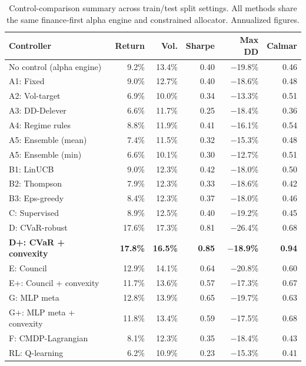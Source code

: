 \documentclass[11pt]{article}
\begin{document}
\begin{table}[t]
\centering
\small
\caption{Control-comparison summary across train/test split settings. All
methods share the same finance-first alpha engine and constrained allocator.
Annualized figures.}
\label{tab:metrics}
\begin{tabular}{@{} l r r r r r @{}}
\toprule
\textbf{Controller} & \textbf{Return} & \textbf{Vol.} & \textbf{Sharpe} & \textbf{Max DD} & \textbf{Calmar} \\
\midrule
No control (alpha engine) & 9.2\% & 13.4\% & 0.40 & $-$19.8\% & 0.46 \\
A1: Fixed & 9.0\% & 12.7\% & 0.40 & $-$18.6\% & 0.48 \\
A2: Vol-target & 6.9\% & 10.0\% & 0.34 & $-$13.3\% & 0.51 \\
A3: DD-Delever & 6.6\% & 11.7\% & 0.25 & $-$18.4\% & 0.36 \\
A4: Regime rules & 8.8\% & 11.9\% & 0.41 & $-$16.1\% & 0.54 \\
A5: Ensemble (mean) & 7.4\% & 11.5\% & 0.32 & $-$15.3\% & 0.48 \\
A5: Ensemble (min) & 6.6\% & 10.1\% & 0.30 & $-$12.7\% & 0.51 \\
B1: LinUCB & 9.0\% & 12.3\% & 0.42 & $-$18.0\% & 0.50 \\
B2: Thompson & 7.9\% & 12.3\% & 0.33 & $-$18.6\% & 0.42 \\
B3: Eps-greedy & 8.4\% & 12.3\% & 0.37 & $-$18.0\% & 0.46 \\
C: Supervised & 8.9\% & 12.5\% & 0.40 & $-$19.2\% & 0.45 \\
D: CVaR-robust & 17.6\% & 17.3\% & 0.81 & $-$26.4\% & 0.68 \\
\textbf{D+: CVaR + convexity} & \textbf{17.8\%} & \textbf{16.5\%} & \textbf{0.85} & \textbf{$-$18.9\%} & \textbf{0.94} \\
E: Council & 12.9\% & 14.1\% & 0.64 & $-$20.8\% & 0.60 \\
E+: Council + convexity & 11.7\% & 13.6\% & 0.57 & $-$17.3\% & 0.67 \\
G: MLP meta & 12.8\% & 13.9\% & 0.65 & $-$19.7\% & 0.63 \\
G+: MLP meta + convexity & 11.8\% & 13.4\% & 0.59 & $-$17.5\% & 0.68 \\
F: CMDP-Lagrangian & 8.1\% & 12.3\% & 0.35 & $-$18.4\% & 0.43 \\
RL: Q-learning & 6.2\% & 10.9\% & 0.23 & $-$15.3\% & 0.41 \\
\bottomrule
\end{tabular}
\end{table}
\end{document}
